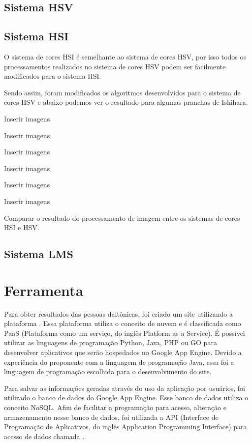 \documentclass[	12pt, Times, openright, twoside, a4paper, english, brazil]{abntex2}
\begin{document}
\subsection{Sistema HSV}
\label{subsec:alterarValues} 

\subsection{Sistema HSI}

O sistema de cores HSI é semelhante ao sistema de cores HSV, por isso todos os processamentos realizados no sistema de cores HSV podem ser facilmente modificados para o sistema HSI.

Sendo assim, foram modificados os algoritmos desenvolvidos para o sistema de cores HSV e abaixo podemos ver o resultado para algumas pranchas de Ishihara.

Inserir imagens

Inserir imagens

Inserir imagens

Inserir imagens

Inserir imagens

Inserir imagens

Comparar o resultado do processamento de imagem entre os sistemas de cores HSI e HSV.

\subsection{Sistema LMS}


\section{Ferramenta}

Para obter resultados das pessoas daltônicas, foi criado um site utilizando a plataforma . Essa plataforma utiliza o conceito de nuvem e é classificada como PaaS (Plataforma como um serviço, do inglês Platform as a Service). É possível utilizar as linguagens de programação Python, Java, PHP ou GO para desenvolver aplicativos que serão hospedados no Google App Engine. Devido a experiência do proponente com a linguagem de programação Java, essa foi a linguagem de programação escolhida para o desenvolvimento do site. 

Para salvar as informações geradas através do uso da aplicação por usuários, foi utilizado o banco de dados do Google App Engine. Esse banco de dados utiliza o conceito NoSQL. Afim de facilitar a programação para acesso, alteração e armazenamento nesse banco de dados, foi utilizada a API (Interface de Programação de Aplicativos, do inglês Application Programming Interface) para acesso de dados chamada .
\end{document}
